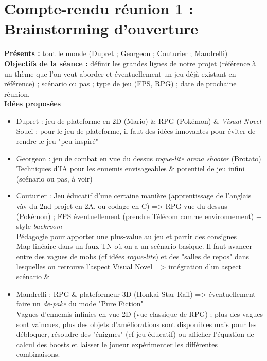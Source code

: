 \documentclass[a4paper, 12pt]{report}
\begin{document}
\section*{Compte-rendu réunion 1 : Brainstorming d'ouverture}

\textbf{Présents :} tout le monde (Dupret ; Georgeon ; Couturier ; Mandrelli)
\\

\textbf{Objectifs de la séance :} définir les grandes lignes de notre projet (référence à un thème que l'on veut aborder et éventuellement un jeu déjà existant en référence) ; scénario ou pas ; type de jeu (FPS, RPG) ; date de prochaine réunion.\\

\textbf{Idées proposées}
\begin{itemize}

\item Dupret : jeu de plateforme en 2D (Mario) \& RPG (Pokémon) \& \textit{Visual Novel}\\
Souci : pour le jeu de plateforme, il faut des idées innovantes pour éviter de rendre le jeu "peu inspiré"
\\

\item Georgeon : jeu de combat en vue du dessus \textit{rogue-lite arena shooter} (Brotato)\\
Techniques d'IA pour les ennemis envisageables \& potentiel de jeu infini (scénario ou pas, à voir)\\

\item Couturier : Jeu éducatif d'une certaine manière (apprentissage de l'anglais vàv du 2nd projet en 2A, ou codage en C) => RPG vue du dessus (Pokémon) ; FPS éventuellement (prendre Télécom comme environnement) + style \textit{backroom}\\
Pédagogie pour apporter une plus-value au jeu et partir des consignes\\
Map linéaire dans un faux TN où on a un scénario basique. Il faut avancer entre des vagues de mobs (cf idées \textit{rogue-lite}) et des "salles de repos" dans lesquelles on retrouve l'aspect Visual Novel => intégration d'un aspect scénario \& 
\\

\item Mandrelli : RPG \& plateformeur 3D (Honkai Star Rail) => éventuellement faire un \textit{de-pake} du mode "Pure Fiction"\\
Vagues d'ennemis infinies en vue 2D (vue classique de RPG) ; plus des vagues sont vaincues, plus des objets d'améliorations sont disponibles mais pour les débloquer, résoudre des "énigmes" (cf jeu éducatif) ou afficher l'équation de calcul des boosts et laisser le joueur expérimenter les différentes combinaisons.\\

\end{itemize}
\end{document}
